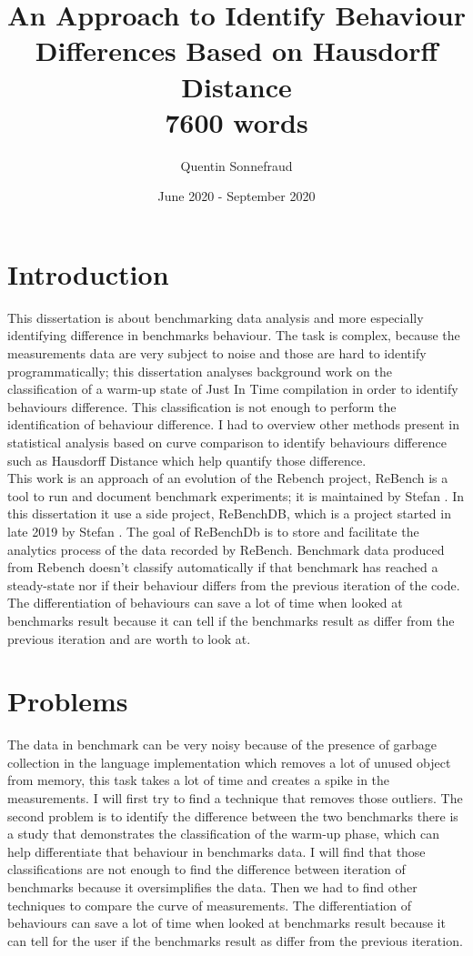 \documentclass{article}
\title{An Approach to Identify Behaviour Differences Based on Hausdorff Distance \\ 7600 words}
\author{Quentin Sonnefraud}
\date{June 2020 - September 2020}
\begin{document}
\maketitle

\tableofcontents


\section{Introduction}

This dissertation is about benchmarking data analysis and more especially identifying difference in benchmarks behaviour. The task is complex, because the measurements data are very subject to noise and those are hard to identify programmatically; this dissertation analyses background work on the classification of a warm-up state of Just In Time compilation in order to identify behaviours difference. This classification is not enough to perform the identification of behaviour difference. I had to overview other methods present in statistical analysis based on curve comparison to identify behaviours difference such as Hausdorff Distance which help quantify those difference.\\
This work is an approach of an evolution of the Rebench project, ReBench is a tool to run and document benchmark experiments; it is maintained by Stefan \citeauthor{ReBench:2018}. In this dissertation it use a side project, ReBenchDB, which is a project started in late 2019 by Stefan \citeauthor{ReBench:2018}. The goal of ReBenchDb is to store and facilitate the analytics process of the data recorded by ReBench. Benchmark data produced from Rebench doesn't classify automatically if that benchmark has reached a steady-state nor if their behaviour differs from the previous iteration of the code.  The differentiation of behaviours can save a lot of time when looked at benchmarks result because it can tell if the benchmarks result as differ from the previous iteration and are worth to look at.  \\ 

\section{Problems}

The data in benchmark can be very noisy because of the presence of garbage collection in the language implementation which removes a lot of unused object from memory, this task takes a lot of time and creates a spike in the measurements. I will first try to find a technique that removes those outliers. The second problem is to identify the difference between the two benchmarks there is a study that demonstrates the classification of the warm-up phase, which can help differentiate that behaviour in benchmarks data. I will find that those classifications are not enough to find the difference between iteration of benchmarks because it oversimplifies the data. Then we had to find other techniques to compare the curve of measurements. The differentiation of behaviours can save a lot of time when looked at benchmarks result because it can tell for the user if the benchmarks result as differ from the previous iteration.
\end{document}
